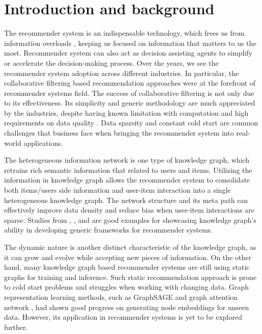 
\section{Introduction and background}
The recommender system is an indispensable technology, which frees us from information overloads \citep{Lu2015}, keeping us focused on information that matters to us the most. Recommender system can also act as decision assisting agents to simplify or accelerate the decision-making process. Over the years, we see the recommender system adoption across different industries. In particular, the collaborative filtering based recommendation approaches were at the forefront of recommender systems field. The success of collaborative filtering is not only due to its effectiveness. Its simplicity and generic methodology are much appreciated by the industries, despite having known limitation with computation and high requirements on data quality \citep{Amatriain2016}. Data sparsity and constant cold start are common challenges that business face when bringing the recommender system into real-world applications. 

The heterogeneous information network \citep{Song2019} is one type of knowledge graph, which retrains rich semantic information that related to users and items. Utilizing the information in knowledge graph allows the recommender system to consolidate both items/users side information and user-item interaction into a single heterogeneous knowledge graph. The network structure and its meta path can effectively improve data density and reduce bias when user-item interactions are sparse. Studies from \citet{qin2020survey}, \citet{wang2018ripplenet}, and \citet{xi2020graph} are good examples for showcasing knowledge graph's ability in developing generic frameworks for recommender systems.

The dynamic nature is another distinct characteristic of the knowledge graph, as it can grow and evolve while accepting new pieces of information. On the other hand, many knowledge graph based recommender systems are still using static graphs for training and inference. Such static recommendation approach is prone to cold start problems and struggles when working with changing data. Graph representation learning methods, such as GraphSAGE \citep{hamilton2017inductive} and graph attention network \citep{velivckovic2017graph}, had shown good progress on generating node embeddings for unseen data. However, its application in recommender systems is yet to be explored further.

